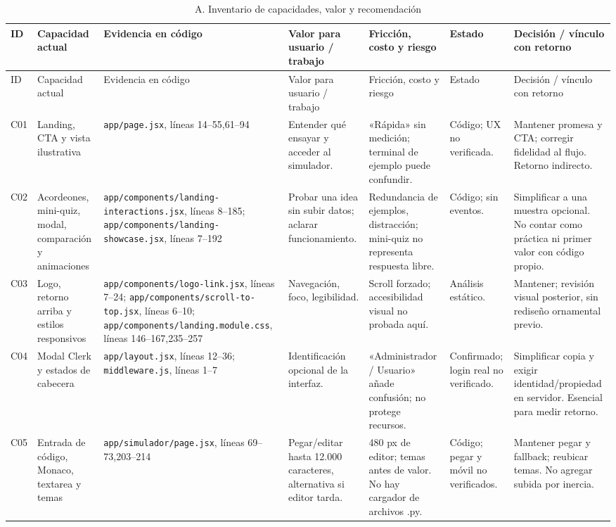 \documentclass[11pt,a4paper]{report}
\newcommand{\src}[2]{\nolinkurl{#1}, líneas #2}
\begin{document}
\begin{landscape}
\small
\begin{longtable}{P{0.8cm}P{3cm}P{5.1cm}P{4cm}P{3.6cm}P{2.5cm}P{4.4cm}}
\caption{A. Inventario de capacidades, valor y recomendación}\label{tab:inventario}\\
\toprule ID & Capacidad actual & Evidencia en código & Valor para usuario / trabajo & Fricción, costo y riesgo & Estado & Decisión / vínculo con retorno \\\midrule\endfirsthead
\toprule ID & Capacidad actual & Evidencia en código & Valor para usuario / trabajo & Fricción, costo y riesgo & Estado & Decisión / vínculo con retorno \\\midrule\endhead
C01 & Landing, CTA y vista ilustrativa & \src{app/page.jsx}{14--55,61--94} & Entender qué ensayar y acceder al simulador. & «Rápida» sin medición; terminal de ejemplo puede confundir. & Código; UX no verificada. & Mantener promesa y CTA; corregir fidelidad al flujo. Retorno indirecto.\\
C02 & Acordeones, mini-quiz, modal, comparación y animaciones & \src{app/components/landing-interactions.jsx}{8--185}; \src{app/components/landing-showcase.jsx}{7--192} & Probar una idea sin subir datos; aclarar funcionamiento. & Redundancia de ejemplos, distracción; mini-quiz no representa respuesta libre. & Código; sin eventos. & Simplificar a una muestra opcional. No contar como práctica ni primer valor con código propio.\\
C03 & Logo, retorno arriba y estilos responsivos & \src{app/components/logo-link.jsx}{7--24}; \src{app/components/scroll-to-top.jsx}{6--10}; \src{app/components/landing.module.css}{146--167,235--257} & Navegación, foco, legibilidad. & Scroll forzado; accesibilidad visual no probada aquí. & Análisis estático. & Mantener; revisión visual posterior, sin rediseño ornamental previo.\\
C04 & Modal Clerk y estados de cabecera & \src{app/layout.jsx}{12--36}; \src{middleware.js}{1--7} & Identificación opcional de la interfaz. & «Administrador / Usuario» añade confusión; no protege recursos. & Confirmado; login real no verificado. & Simplificar copia y exigir identidad/propiedad en servidor. Esencial para medir retorno.\\
C05 & Entrada de código, Monaco, textarea y temas & \src{app/simulador/page.jsx}{69--73,203--214} & Pegar/editar hasta 12.000 caracteres, alternativa si editor tarda. & 480 px de editor; temas antes de valor. No hay cargador de archivos .py. & Código; pegar y móvil no verificados. & Mantener pegar y fallback; reubicar temas. No agregar subida por inercia.\\

\end{longtable}
\end{landscape}
\end{document}
